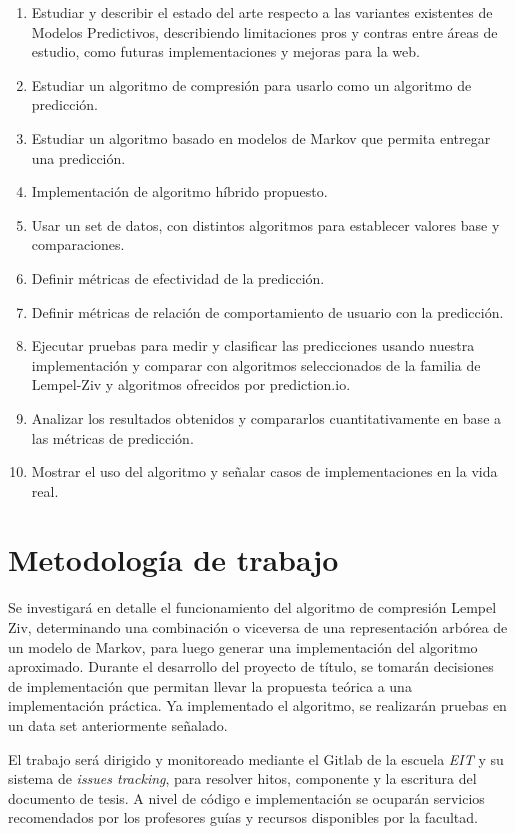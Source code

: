 \documentclass{udparticle}
\begin{document}
\begin{enumerate}
  \item Estudiar y describir el estado del arte respecto a las variantes existentes de Modelos Predictivos, describiendo limitaciones pros y contras entre áreas de estudio, como futuras implementaciones y mejoras para la web.
  \item Estudiar un algoritmo de compresión para usarlo como un algoritmo de predicción.
  \item Estudiar un algoritmo basado en modelos de Markov que permita entregar una predicción.
  \item Implementación de algoritmo híbrido propuesto.
  \item Usar un set de datos, con distintos algoritmos para establecer valores base y comparaciones.
  \item Definir métricas de efectividad de la predicción.
  \item Definir métricas de relación de comportamiento de usuario con la predicción. 
  \item Ejecutar pruebas para medir y clasificar las predicciones usando nuestra implementación y comparar con algoritmos seleccionados de la familia de Lempel-Ziv y algoritmos ofrecidos por prediction.io. %
  
  \item Analizar los resultados obtenidos y compararlos cuantitativamente en base a las métricas de predicción.
  \item Mostrar el uso del algoritmo y señalar casos de  implementaciones en la vida real.
\end{enumerate}


\section{Metodología de trabajo}

Se investigará en detalle el funcionamiento del algoritmo de compresión Lempel Ziv, determinando una combinación o viceversa de una representación arbórea de un modelo de Markov, para luego generar una implementación del algoritmo aproximado.
Durante el desarrollo del proyecto de título, se tomarán decisiones de implementación que permitan llevar la propuesta teórica a una implementación práctica. Ya implementado el algoritmo, se realizarán pruebas en un data set anteriormente señalado.

El trabajo será dirigido y monitoreado mediante el Gitlab de la escuela \emph{EIT} y su sistema de \emph{issues tracking}, para resolver hitos, componente y la escritura del documento de tesis. A nivel de código e implementación se ocuparán servicios recomendados por los profesores guías y recursos disponibles por la facultad.
\end{document}
